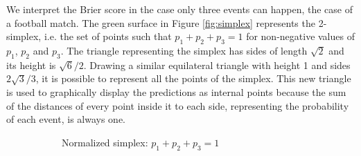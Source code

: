 \documentclass[journal,article,accept,moreauthors,pdftex,12pt,a4paper]{mdpi}
\begin{document}
We interpret the Brier score in the case only three events can happen, the case of a football match.
The green surface in Figure \ref{fig:simplex} represents the 2-simplex, i.e. the set of points such that $p_1+p_2+p_3=1$ for non-negative values of $p_1$, $p_2$ and $p_3$.
The triangle representing the simplex has sides of length $\sqrt{2}$ and its height is $\sqrt{6}/2$.
Drawing a similar equilateral triangle with height 1 and sides $2\sqrt{3}/3$, it is possible to represent all the points of the simplex.
This new triangle is used to graphically display the predictions as internal points because the sum of the distances of every point inside it to each side, representing the probability of each event, is always one.

\begin{figure}[!ht]
    \centering
    \begin{subfigure}[b]{0.48\linewidth}        %
        \centering



        \caption{Normalized simplex: $p_1+p_2+p_3=1$}
        \label{fig:A}
    \end{subfigure}
    \begin{subfigure}[b]{0.48\linewidth}        %
        \centering

\end{subfigure}
\end{figure}
\end{document}
